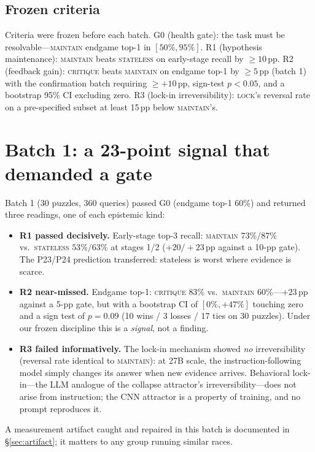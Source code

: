 \documentclass[10pt]{article}
\newcommand{\Mstate}{\textsc{stateless}}
\newcommand{\Mlock}{\textsc{lock}}
\newcommand{\Mmaint}{\textsc{maintain}}
\newcommand{\Mcrit}{\textsc{critique}}
\begin{document}
\subsection{Frozen criteria}
\label{sec:frozen}

Criteria were frozen before each batch. G0 (health gate): the task must
be resolvable---\Mmaint{} endgame top-1 in $[50\%, 95\%]$. R1
(hypothesis maintenance): \Mmaint{} beats \Mstate{} on early-stage recall
by $\ge 10$\,pp. R2 (feedback gain): \Mcrit{} beats \Mmaint{} on endgame
top-1 by $\ge 5$\,pp (batch 1) with the confirmation batch requiring
$\ge +10$\,pp, sign-test $p < 0.05$, and a bootstrap 95\% CI excluding
zero. R3 (lock-in irreversibility): \Mlock{}'s reversal rate on a
pre-specified subset at least 15\,pp below \Mmaint{}'s.

\section{Batch 1: a 23-point signal that demanded a gate}
\label{sec:batch1}

Batch 1 (30 puzzles, 360 queries) passed G0 (endgame top-1 $60\%$) and
returned three readings, one of each epistemic kind:
\begin{itemize}
\item \textbf{R1 passed decisively.} Early-stage top-3 recall:
  \Mmaint{} $73\%/87\%$ vs.\ \Mstate{} $53\%/63\%$ at stages 1/2
  ($+20/+23$\,pp against a 10-pp gate). The P23/P24 prediction
  transferred: stateless is worst where evidence is scarce.
\item \textbf{R2 near-missed.} Endgame top-1: \Mcrit{} $83\%$ vs.\
  \Mmaint{} $60\%$---$+23$\,pp against a 5-pp gate, but with a bootstrap
  CI of $[0\%, +47\%]$ touching zero and a sign test of $p = 0.09$
  (10 wins / 3 losses / 17 ties on 30 puzzles). Under our frozen
  discipline this is a \emph{signal}, not a finding.
\item \textbf{R3 failed informatively.} The lock-in mechanism showed
  \emph{no} irreversibility (reversal rate identical to \Mmaint{}): at
  27B scale, the instruction-following model simply changes its answer
  when new evidence arrives. Behavioral lock-in---the LLM analogue of the
  collapse attractor's irreversibility---does not arise from instruction;
  the CNN attractor is a property of training, and no prompt reproduces it.
\end{itemize}

A measurement artifact caught and repaired in this batch is documented in
\S\ref{sec:artifact}; it matters to any group running similar races.
\end{document}
